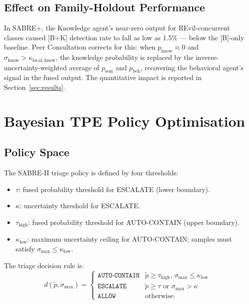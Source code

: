 \documentclass[journal]{IEEEtran}
\newcommand{\sem}{\mathrm{sem}}
\newcommand{\beh}{\mathrm{beh}}
\newcommand{\know}{\mathrm{know}}
\newcommand{\tauh}{\tau_{\mathrm{high}}}
\newcommand{\klow}{\kappa_{\mathrm{low}}}
\newcommand{\pfused}{\tilde{p}}
\begin{document}
\subsection{Effect on Family-Holdout Performance}

In SABRE+, the Knowledge agent's near-zero output for REvil-concurrent
classes caused [B+K] detection rate to fall as low as 1.5\% --- below
the [B]-only baseline.
Peer Consultation corrects for this: when $p_{\know} \approx 0$
and $\sigma_{\know} > \kappa_{\mathrm{local},\know}$, the knowledge
probability is replaced by the inverse-uncertainty-weighted average of
$p_{\sem}$ and $p_{\beh}$, recovering the behavioral agent's signal in
the fused output.
The quantitative impact is reported in Section~\ref{sec:results}.


\section{Bayesian TPE Policy Optimisation}
\label{sec:bayesian_tpe}

\subsection{Policy Space}

The SABRE-II triage policy is defined by four thresholds:
\begin{itemize}
  \item $\tau$: fused probability threshold for ESCALATE (lower boundary).
  \item $\kappa$: uncertainty threshold for ESCALATE.
  \item $\tauh$: fused probability threshold for AUTO-CONTAIN (upper boundary).
  \item $\klow$: maximum uncertainty ceiling for AUTO-CONTAIN; samples must satisfy $\sigma_{\max} \leq \klow$.
\end{itemize}

The triage decision rule is:
\begin{equation}
  d(\pfused, \sigma_{\max}) = \begin{cases}
    \texttt{AUTO-CONTAIN} & \pfused \geq \tauh,\,\sigma_{\max} \leq \klow \\
    \texttt{ESCALATE}     & \pfused \geq \tau \text{ or } \sigma_{\max} > \kappa \\
    \texttt{ALLOW}        & \text{otherwise.}
  \end{cases}
\end{equation}
\end{document}

